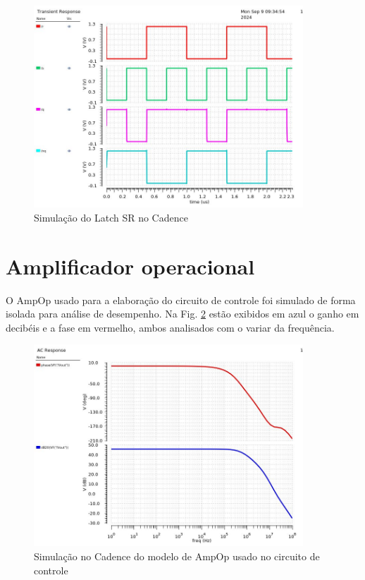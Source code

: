 \begin{figure}[htb]
	\centering
	\includegraphics[width=0.9\textwidth]{figuras/imgs_jv/sim_lach.jpg}
	\caption{Simulação do Latch SR no Cadence }
	\label{fig18}
\end{figure}


\section{Amplificador operacional}

O AmpOp usado para a elaboração do circuito de controle foi simulado de forma isolada para análise de desempenho. Na Fig. \ref{fig19} estão exibidos em azul o ganho em decibéis e a fase em vermelho, ambos analisados com o variar da frequência.

\begin{figure}[htb]
	\centering
	\includegraphics[width=0.9\textwidth]{figuras/imgs_jv/sim_ampop.jpg}
	\caption{ Simulação no Cadence do modelo de AmpOp usado no circuito de controle }
	\label{fig19}
\end{figure}



